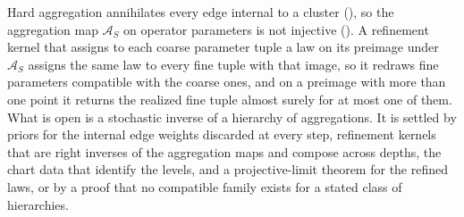 Hard aggregation annihilates every edge internal to a cluster
(), so the aggregation map \(\mathcal A_S\) on operator parameters
is not injective (). A refinement kernel that assigns to each
coarse parameter tuple a law on its preimage under \(\mathcal A_S\) assigns the same law to every fine
tuple with that image, so it redraws fine parameters compatible with the coarse ones, and on a
preimage with more than one point it returns the realized fine tuple almost surely for at most one of
them. What is open is a stochastic inverse of a hierarchy of aggregations.
It is settled by priors for the internal edge weights discarded at every step, refinement kernels that
are right inverses of the aggregation maps and compose across depths, the chart data that identify the
levels, and a projective-limit theorem for the refined laws, or by a proof that no compatible family
exists for a stated class of hierarchies.

